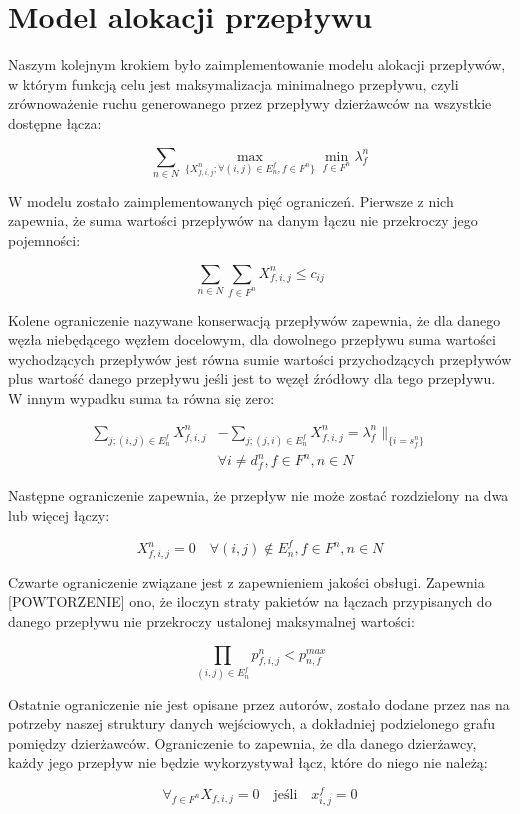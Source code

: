 \section{Model alokacji przepływu}

Naszym kolejnym krokiem było zaimplementowanie modelu alokacji przepływów, w
którym funkcją celu jest maksymalizacja minimalnego przepływu, czyli zrównoważenie
ruchu generowanego przez przepływy dzierżawców na wszystkie dostępne łącza:

\begin{equation}
  \sum_{n \in N} \max_{\{X_{f,i,j}^n;\forall{(i,j)} \in E_n^f,f \in F^n\}} \min_{f \in F^n}\lambda_f^n
\end{equation}

W modelu zostało zaimplementowanych pięć ograniczeń. Pierwsze z nich zapewnia,
że suma wartości przepływów na danym łączu nie przekroczy jego pojemności:

\begin{equation}
  \sum_{n \in N} \sum_{f \in F^n} X_{f,i,j}^n \le c_{ij}
\end{equation}

Kolene ograniczenie nazywane konserwacją przepływów zapewnia, że dla danego węzła
niebędącego węzłem docelowym, dla dowolnego przepływu suma wartości wychodzących
przepływów jest równa sumie wartości przychodzących przepływów plus wartość danego
przepływu jeśli jest to węzęł źródłowy dla tego przepływu. W innym wypadku suma ta
równa się zero:

\begin{equation}
\begin{align*}
  \sum_{j;(i,j) \in E_n^f} X_{f,i,j}^n &- \sum_{j;(j,i) \in E_n^f} X_{f,i,j}^n = \lambda_f^n \parallel_{\{i=s_f^n\}} \\
  & \forall{i} \ne d_f^n, f \in F^n, n \in N
\end{align*}
\end{equation}

Następne ograniczenie zapewnia, że przepływ nie może zostać rozdzielony na
dwa lub więcej łączy:

\begin{equation}
  X_{f,i,j}^n = 0 \quad \forall(i,j) \notin E_n^f, f \in F^n, n \in N
\end{equation}

Czwarte ograniczenie związane jest z zapewnieniem jakości obsługi. Zapewnia [POWTORZENIE] ono, że
iloczyn straty pakietów na łączach przypisanych do danego przepływu nie przekroczy
ustalonej maksymalnej wartości:

\begin{equation}
  \prod_{(i,j) \in E_n^f} p_{f,i,j}^n < p_{n,f}^{max}
\end{equation}

Ostatnie ograniczenie nie jest opisane przez autorów, zostało dodane przez nas
na potrzeby naszej struktury danych wejściowych, a dokładniej podzielonego grafu pomiędzy
dzierżawców. Ograniczenie to zapewnia, że dla danego dzierżawcy, każdy jego przepływ
nie będzie wykorzystywał łącz, które do niego nie należą:

\begin{equation}
  \forall_{f \in F^n} X_{f,i,j} = 0 \quad \text{jeśli}\quad x_{i,j}^f = 0
\end{equation}
